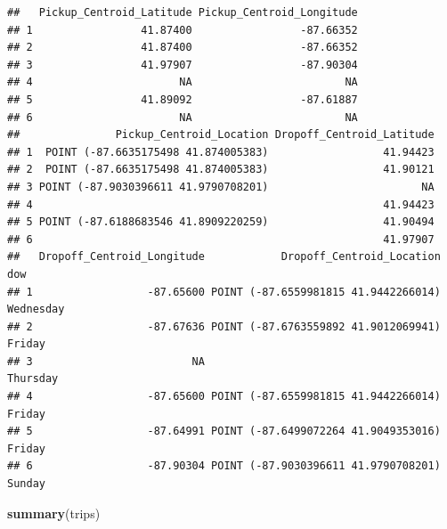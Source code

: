 \documentclass[
]{article}
\newenvironment{Shaded}{\begin{snugshade}}{\end{snugshade}}
\newcommand{\FunctionTok}[1]{\textcolor[rgb]{0.13,0.29,0.53}{\textbf{#1}}}
\newcommand{\NormalTok}[1]{#1}
\begin{document}
\begin{verbatim}
##   Pickup_Centroid_Latitude Pickup_Centroid_Longitude
## 1                 41.87400                 -87.66352
## 2                 41.87400                 -87.66352
## 3                 41.97907                 -87.90304
## 4                       NA                        NA
## 5                 41.89092                 -87.61887
## 6                       NA                        NA
##               Pickup_Centroid_Location Dropoff_Centroid_Latitude
## 1  POINT (-87.6635175498 41.874005383)                  41.94423
## 2  POINT (-87.6635175498 41.874005383)                  41.90121
## 3 POINT (-87.9030396611 41.9790708201)                        NA
## 4                                                       41.94423
## 5 POINT (-87.6188683546 41.8909220259)                  41.90494
## 6                                                       41.97907
##   Dropoff_Centroid_Longitude            Dropoff_Centroid_Location       dow
## 1                  -87.65600 POINT (-87.6559981815 41.9442266014) Wednesday
## 2                  -87.67636 POINT (-87.6763559892 41.9012069941)    Friday
## 3                         NA                                       Thursday
## 4                  -87.65600 POINT (-87.6559981815 41.9442266014)    Friday
## 5                  -87.64991 POINT (-87.6499072264 41.9049353016)    Friday
## 6                  -87.90304 POINT (-87.9030396611 41.9790708201)    Sunday
\end{verbatim}

\begin{Shaded}
\begin{Highlighting}[]
\FunctionTok{summary}\NormalTok{(trips)}
\end{Highlighting}
\end{Shaded}
\end{document}
